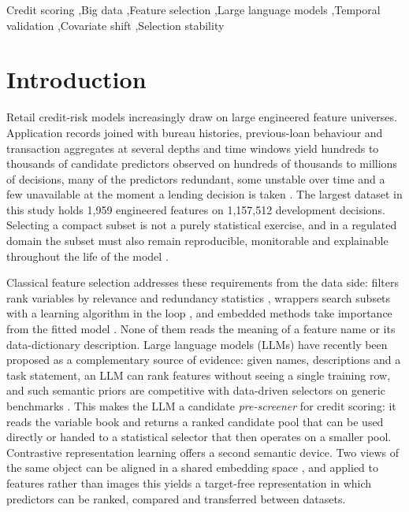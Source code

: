 \documentclass[final,5p,twocolumn]{elsarticle}
\begin{document}
\begin{frontmatter}
\begin{keyword}
Credit scoring \sep Big data \sep Feature selection \sep Large language models \sep Temporal validation \sep Covariate shift \sep Selection stability
\end{keyword}

\end{frontmatter}


\section{Introduction}
\label{sec:introduction}

Retail credit-risk models increasingly draw on large engineered feature universes. Application records joined with bureau histories, previous-loan behaviour and transaction aggregates at several depths and time windows yield hundreds to thousands of candidate predictors observed on hundreds of thousands to millions of decisions, many of the predictors redundant, some unstable over time and a few unavailable at the moment a lending decision is taken \cite{thomas2002,siddiqi2006}. The largest dataset in this study holds 1,959 engineered features on 1,157,512 development decisions. Selecting a compact subset is not a purely statistical exercise, and in a regulated domain the subset must also remain reproducible, monitorable and explainable throughout the life of the model \cite{lessmann2015,gunnarsson2021,ballegeer2025}.

Classical feature selection addresses these requirements from the data side: filters rank variables by relevance and redundancy statistics \cite{guyon2003,peng2005}, wrappers search subsets with a learning algorithm in the loop \cite{kohavi1997,guyon2002,kursa2010}, and embedded methods take importance from the fitted model \cite{tibshirani1996,lundberg2017}. None of them reads the meaning of a feature name or its data-dictionary description. Large language models (LLMs) have recently been proposed as a complementary source of evidence: given names, descriptions and a task statement, an LLM can rank features without seeing a single training row, and such semantic priors are competitive with data-driven selectors on generic benchmarks \cite{choi2022,jeong2025,li2025sigkdd,zhang2025llmlasso}. This makes the LLM a candidate \emph{pre-screener} for credit scoring: it reads the variable book and returns a ranked candidate pool that can be used directly or handed to a statistical selector that then operates on a smaller pool. Contrastive representation learning offers a second semantic device. Two views of the same object can be aligned in a shared embedding space \cite{radford2021,oord2018}, and applied to features rather than images this yields a target-free representation in which predictors can be ranked, compared and transferred between datasets.
\end{document}

